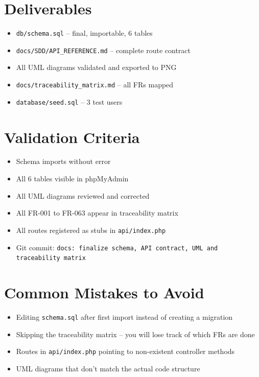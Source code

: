\documentclass[11pt,a4paper]{report}
\newcommand{\todo}{\textcolor{helixamber}{\textbf{[ ]}}}
\newcommand{\filepath}[1]{\texttt{\small#1}}
\begin{document}
\section*{Deliverables}

\begin{itemize}
    \item \filepath{db/schema.sql} -- final, importable, 6 tables
    \item \filepath{docs/SDD/API\_REFERENCE.md} -- complete route contract
    \item All UML diagrams validated and exported to PNG
    \item \filepath{docs/traceability\_matrix.md} -- all FRs mapped
    \item \filepath{database/seed.sql} -- 3 test users
\end{itemize}

\section*{Validation Criteria}

\begin{itemize}
    \item[\todo] Schema imports without error
    \item[\todo] All 6 tables visible in phpMyAdmin
    \item[\todo] All UML diagrams reviewed and corrected
    \item[\todo] All FR-001 to FR-063 appear in traceability matrix
    \item[\todo] All routes registered as stubs in \filepath{api/index.php}
    \item[\todo] Git commit: \texttt{docs: finalize schema, API contract, UML and traceability matrix}
\end{itemize}

\section*{Common Mistakes to Avoid}

\begin{warnbox}[title=Watch Out]
\begin{itemize}
    \item[$\times$] Editing \filepath{schema.sql} after first import instead of creating a migration
    \item[$\times$] Skipping the traceability matrix -- you will lose track of which FRs are done
    \item[$\times$] Routes in \filepath{api/index.php} pointing to non-existent controller methods
    \item[$\times$] UML diagrams that don't match the actual code structure
\end{itemize}
\end{warnbox}
\end{document}

